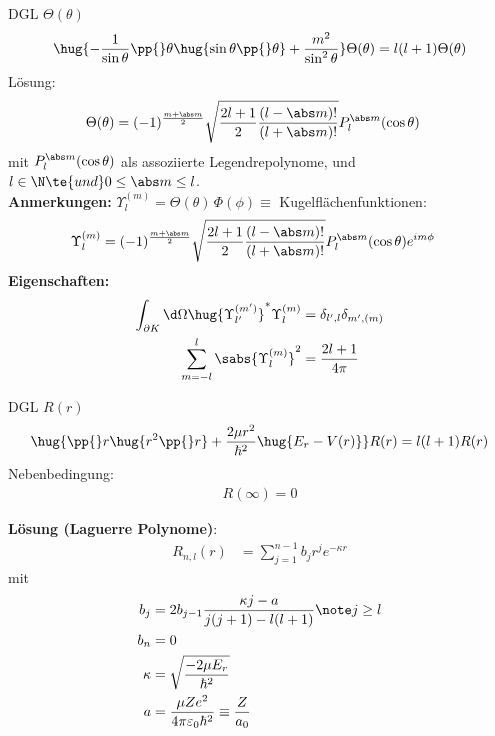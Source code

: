 \documentclass[twocolumn]{summery_4.1}
\begin{document}
{\large DGL $\Theta(\theta)$}
\begin{align*}
    \hug{-\frac{1}{\sin\theta}\pp{}\theta \hug{\sin\theta\pp{}\theta}  + \frac{m^2}{\sin^2\theta}}\Theta(\theta) =  l(l+1)\Theta(\theta)
\end{align*}
Lösung:
\begin{align*}
    \Theta(\theta) &= (-1)^{\frac{m+\abs m}{2}} \sqrt{\frac{2l +1}{2} \frac{(l - \abs m)!}{(l+\abs m)!}} P_l^{\abs m}(\cos\theta) 
\end{align*}
mit \( P_l^{\abs m}(\cos\theta)\) als assoziierte Legendrepolynome, und \( l\in \N\te{ und } 0 \le \abs m \le l\).\\

\textbf{Anmerkungen:} \(\Upsilon_{l}^{(m)}=\Theta(\theta)\,\Phi(\phi) \equiv\) Kugelflächenfunktionen:
\begin{align*}
    \Upsilon_l^{(m)} &=  (-1)^{\frac{m+\abs m}{2}} \sqrt{\frac{2l +1}{2} \frac{(l - \abs m)!}{(l+\abs m)!}} P_l^{\abs m}(\cos\theta) e^{im\phi}
\end{align*}
\textbf{Eigenschaften:}
\begin{align*}
    \int_{\partial K} \d\Omega \hug{\Upsilon_{l'}^{(m')}}^* \Upsilon_{l}^{(m)} &= \delta_{l',l} \delta_{m',(m)} \\
    \sum_{m=-l}^l \sabs{\Upsilon_{l}^{(m)}}^2 &= \frac{2l + 1}{4\pi}
\end{align*}

{\large DGL $R(r)$}
\begin{align*}
    \hug{\pp{}r \hug{r^2\pp{}r} + \frac{2\mu r^2}{\hbar^2} \hug{E_r - V(r)}} R(r) = l(l+1) R(r)
\end{align*}
Nebenbedingung:
\begin{align*}
    R(\infty) =0
\end{align*}

\textbf{Lösung (Laguerre Polynome)}:
\begin{align*}
    R_{n,l}(r) &=  \sum_{j=1}^{n-1} b_j r^j e^{-\kappa r}
\end{align*}
mit 
\begin{align*}
    b_j &= 2b_{j-1} \frac{\kappa j - a}{j(j+1) - l (l+1)}\note j\ge l\\
    b_n &= 0\\ 
    \kappa &= \sqrt{\frac{-2\mu E_r}{\hbar^2}} \\
    a &= \frac{\mu Z e^2}{4\pi \varepsilon_0 \hbar^2} \equiv  \frac{Z}{a_0}\\
\end{align*}
\end{document}
